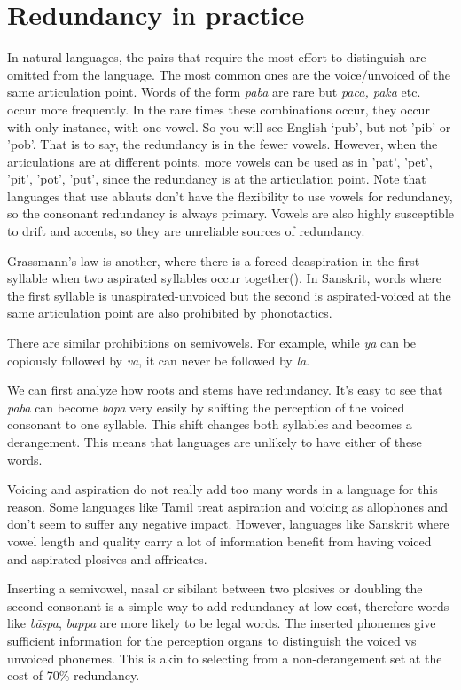 \documentclass{article}
\begin{document}
\section{Redundancy in practice}
In natural languages, the pairs that require the most effort to distinguish are omitted from the language. The most common ones are the voice/unvoiced of the same articulation point. Words of the form \emph{paba} are rare but \emph{paca, paka} etc. occur more frequently. In the rare times these combinations occur, they occur with only instance, with one vowel. So you will see English `pub', but not 'pib' or 'pob'. That is to say, the redundancy is in the fewer vowels. However, when the articulations are at different points, more vowels can be used as in 'pat', 'pet', 'pit', 'pot', 'put', since the redundancy is at the articulation point. Note that languages that use ablauts don't have the flexibility to use vowels for redundancy, so the consonant redundancy is always primary. Vowels are also highly susceptible to drift and accents, so they are unreliable sources of redundancy.

Grassmann's law is another, where there is a forced deaspiration in the first syllable when two aspirated syllables occur together(\cite{grassman}). In Sanskrit, words where the first syllable is unaspirated-unvoiced but the second is aspirated-voiced at the same articulation point are also prohibited by phonotactics.

There are similar prohibitions on semivowels. For example, while \emph{ya} can be copiously followed by \emph{va}, it can never be followed by \emph{la}.

We can first analyze how roots and stems have redundancy. It's easy to see that \emph{paba} can become \emph{bapa} very easily by shifting the perception of the voiced consonant to one syllable. This shift changes both syllables and becomes a derangement. This means that languages are unlikely to have either of these words.

Voicing and aspiration do not really add too many words in a language for this reason. Some languages like Tamil treat aspiration and voicing as allophones and don't seem to suffer any negative impact. However, languages like Sanskrit where vowel length and quality carry a lot of information benefit from having voiced and aspirated plosives and affricates.

Inserting a semivowel, nasal or sibilant between two plosives or doubling the second consonant is a simple way to add redundancy at low cost, therefore words like \emph{bāṣpa}, \emph{bappa} are more likely to be legal words. The inserted phonemes give sufficient information for the perception organs to distinguish the voiced vs unvoiced phonemes. This is akin to selecting from a non-derangement set at the cost of 70\% redundancy.
\end{document}
